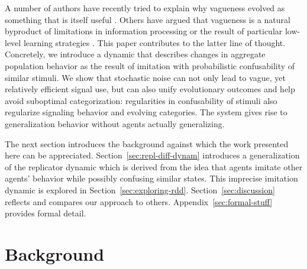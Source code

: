\documentclass[fleqn,reqno,10pt]{article}
\begin{document}
A number of authors have recently tried to explain why vagueness evolved as something that is
itself useful
\citep[e.g.][]{Jaegherde-Jaegher2003:A-Game-Theoreti,Deemter2009:Utility-and-Lan,BlumeBoard2013:Intentional-Vag}.
Others have argued that vagueness is a natural byproduct of limitations in information
processing \citep[e.g.][]{FrankeJager2010:Vagueness-Signa} or the result of particular
low-level learning strategies \citep[e.g.][]{OConnor2013:The-Evolution-o}. This paper
contributes to the latter line of thought. Concretely, we introduce a dynamic that describes
changes in aggregate population behavior as the result of imitation with probabilistic
confusability of similar stimuli. We show that stochastic noise can not only lead to vague, yet
relatively efficient signal use, but can also unify evolutionary outcomes and help avoid
suboptimal categorization: regularities in confusability of stimuli also regularize signaling
behavior and evolving categories. The system gives rise to generalization behavior without
agents actually generalizing.

The next section introduces the background against which the work presented here can be
appreciated. Section~\ref{sec:repl-diff-dynam} introduces a generalization of the replicator
dynamic which is derived from the idea that agents imitate other agents' behavior while
possibly confusing similar states. This imprecise imitation dynamic is explored in
Section~\ref{sec:exploring-rdd}. Section~\ref{sec:discussion} reflects and compares our
approach to others. Appendix~\ref{sec:formal-stuff} provides formal detail.

\section{Background}
\label{sec:background}

\end{document}
